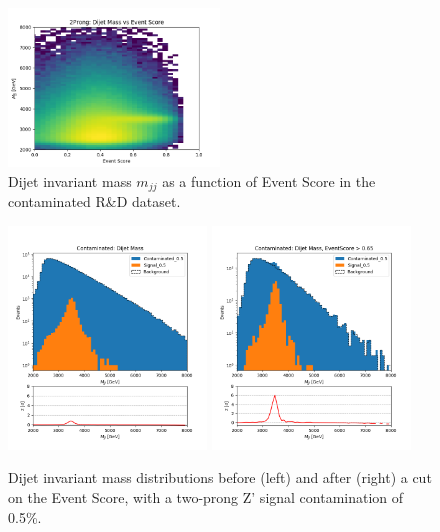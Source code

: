 \documentclass[letterpaper,11pt]{article}
\begin{document}
\begin{figure}[h!]
\centering
\includegraphics[width=0.5\textwidth]{imgs/ProcR_2Prong_Contaminated_10p0_2Prong_Contaminated_10p0_Weights_Event_ConstOnly_Avg_JJ_M_vs_Event_Score.png}
\caption{Dijet invariant mass $m_{jj}$ as a function of Event Score in the contaminated R\&D dataset.}
\label{fig:m_v_s}
\end{figure}

\begin{figure}[h!]
	\begin{center}
		\includegraphics[width=0.47\textwidth]{imgs/2Prong_Contaminated_0p5_JJ_Mass_Multi.png}
		\includegraphics[width=0.47\textwidth]{imgs/2Prong_Contaminated_0p5_JJ_Mass_EventScore0p65_Multi.png}
	\end{center}
	\caption{Dijet invariant mass distributions before (left) and after (right) a cut on the Event Score, with a two-prong Z' signal contamination of 0.5\%.}
	\label{fig:m_JJ}
\end{figure}
\end{document}
